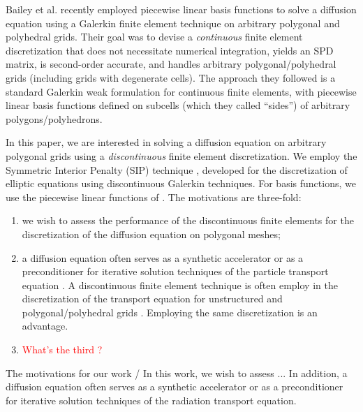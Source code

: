 \documentclass[preprint,10pt]{elsarticle}
\newcommand\red{\textcolor{red}}
\renewcommand{\(}{\left(}
\renewcommand{\)}{\right)}
\renewcommand{\[}{\left[}
\renewcommand{\]}{\right]}
\begin{document}
%
%
Bailey et al. \cite{Bailey2008a} recently employed piecewise linear basis
functions to solve a diffusion equation using a Galerkin finite element technique on 
arbitrary polygonal and polyhedral grids. Their goal was to devise a {\em continuous} finite 
element discretization that does not necessitate numerical integration, yields an SPD matrix, 
is second-order accurate, and handles arbitrary polygonal/polyhedral grids (including 
grids with degenerate cells). The approach they followed is a standard Galerkin weak 
formulation for continuous finite elements, with piecewise linear basis functions 
defined on subcells (which they called ``sides'') of arbitrary polygons/polyhedrons.

In this paper, we are interested in solving a diffusion equation on arbitrary polygonal
grids using a {\em discontinuous} finite element discretization. We employ the
Symmetric Interior Penalty (SIP) technique \cite{IPRefs}, developed for the discretization
of elliptic equations using discontinuous Galerkin techniques. For basis functions,
we use the piecewise linear functions of \cite{Bailey2008a}.
The motivations are three-fold: 
\begin{enumerate}
\item we wish to assess the performance of the discontinuous finite elements for 
the discretization of the diffusion equation on polygonal meshes;
\item a diffusion equation often serves as a synthetic accelerator or as a
preconditioner for iterative solution techniques of the particle transport equation
\cite{AdamsLarsen2002}. A discontinuous finite element technique is often employ
in the discretization of the transport equation for unstructured and 
polygonal/polyhedral grids \cite{MorelWarsaWareing,PWLD,CFEM-PWDL-Warsa,WangRagusa}.
Employing the same discretization is an advantage.   
\item \red{What's the third ?}
\end{enumerate}
The motivations for our work / In this work, we wish to assess ... In addition,
a diffusion equation often serves as a synthetic accelerator or as a
preconditioner \cite{AdamsLarsen2002} for iterative solution techniques of the 
radiation transport equation.
\end{document}
